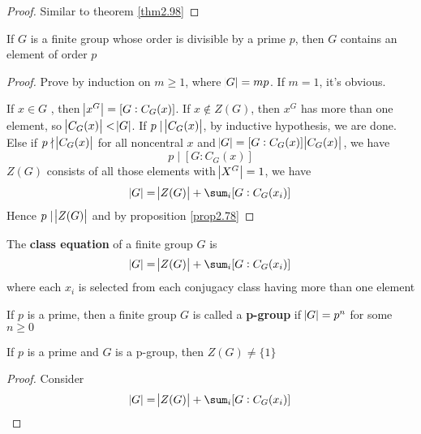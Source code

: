 \documentclass[11pt]{article}
\begin{document}
\begin{proof}
Similar to theorem \ref{thm2.98}
\end{proof}

\begin{theorem}[Cauchy]
\label{thmCauchy}
If \(G\) is a finite group whose order is divisible by a prime \(p\), then \(G\)
contains an element of order \(p\)
\end{theorem}

\begin{proof}
Prove by induction on \(m\ge 1\), where \(\abs{G}=mp\). If \(m=1\), it's obvious.

If \(x\in G\) , then \(\abs{x^G}=[G:C_G(x)]\). If \(x\not\in Z(G)\), then \(x^G\)
has more than one element, so \(\abs{C_G(x)}<\abs{G}\). If \(p\mid \abs{C_G(x)}\), by
inductive hypothesis, we are done. Else if \(p\nmid \abs{C_G(x)}\) for all
noncentral \(x\) and \(\abs{G}=[G:C_G(x)]\abs{C_G(x)}\), we have
\begin{equation*}
p\mid[G:C_G(x)]
\end{equation*}
\(Z(G)\) consists of all those elements with \(\abs{X^G}=1\), we have
\begin{equation*}
\abs{G}=\abs{Z(G)}+\displaystyle\sum_i[G:C_G(x_i)]
\end{equation*}
Hence \(p\mid\abs{Z(G)}\) and by proposition \ref{prop2.78}
\end{proof}

\begin{definition}[]
The \textbf{class equation} of a finite group \(G\) is
\begin{equation*}
\abs{G}=\abs{Z(G)}+\displaystyle\sum_i[G:C_G(x_i)]
\end{equation*}
where each \(x_i\) is selected from each conjugacy class having more than one element
\end{definition}

\begin{definition}[]
If \(p\) is a prime, then a finite group \(G\) is called a \textbf{p-group} if
\(\abs{G}=p^n\) for some \(n\ge 0\)
\end{definition}

\begin{theorem}[]
\label{thm2.103}
If \(p\) is a prime and \(G\) is a p-group, then \(Z(G)\neq\{1\}\)
\end{theorem}

\begin{proof}
Consider 
\begin{equation*}
\abs{G}=\abs{Z(G)}+\displaystyle\sum_i[G:C_G(x_i)]
\end{equation*}
\end{proof}
\end{document}
